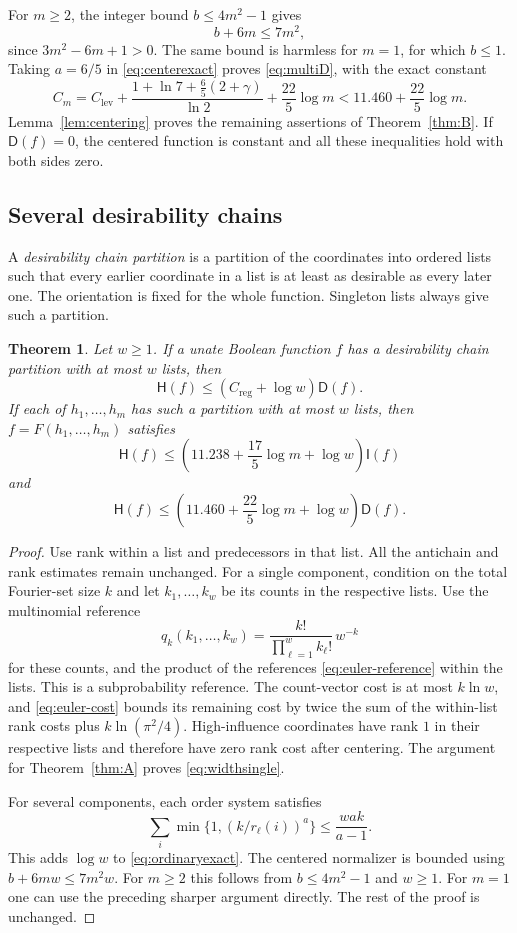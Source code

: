 \documentclass[11pt]{amsart}
\newtheorem{theorem}{Theorem}[section]
\theoremstyle{definition}
\theoremstyle{remark}
\newcommand{\HH}{\mathsf H}
\newcommand{\I}{\mathsf I}
\newcommand{\D}{\mathsf D}
\newcommand{\Clev}{C_{\mathrm{lev}}}
\newcommand{\Creg}{C_{\mathrm{reg}}}
\newcommand{\Cmulti}{C_m}
\begin{document}
For $m\ge2$, the integer bound $b\le4m^2-1$ gives
\[
 b+6m\le7m^2,
\]
since $3m^2-6m+1>0$.
The same bound is harmless for $m=1$, for which $b\le1$.
Taking $a=6/5$ in \eqref{eq:centerexact} proves \eqref{eq:multiD}, with the exact constant
\begin{equation}\label{eq:cm}
 \Cmulti=\Clev+\frac{1+\ln7+\frac65(2+\gamma)}{\ln2}
               +\frac{22}{5}\log m
       <11.460+\frac{22}{5}\log m.
\end{equation}
Lemma~\ref{lem:centering} proves the remaining assertions of Theorem~\ref{thm:B}.
If $\D(f)=0$, the centered function is constant and all these inequalities hold with both sides zero.

\subsection{Several desirability chains}

A \emph{desirability chain partition} is a partition of the coordinates into ordered lists such that every earlier coordinate in a list is at least as desirable as every later one.
The orientation is fixed for the whole function.
Singleton lists always give such a partition.

\begin{theorem}\label{thm:width}
Let $w\ge1$. If a unate Boolean function $f$ has a desirability chain partition with at most $w$ lists, then
\begin{equation}\label{eq:widthsingle}
 \HH(f)\le(\Creg+\log w)\D(f).
\end{equation}
If each of $h_1,\ldots,h_m$ has such a partition with at most $w$ lists, then $f=F(h_1,\ldots,h_m)$ satisfies
\[
 \HH(f)\le\left(11.238+\frac{17}{5}\log m+\log w\right)\I(f)
\]
and
\[
 \HH(f)\le\left(11.460+\frac{22}{5}\log m+\log w\right)\D(f).
\]
\end{theorem}
\begin{proof}
Use rank within a list and predecessors in that list.
All the antichain and rank estimates remain unchanged.
For a single component, condition on the total Fourier-set size $k$ and
let $k_1,\ldots,k_w$ be its counts in the respective lists.
Use the multinomial reference
\[
 q_k(k_1,\ldots,k_w)=\frac{k!}{\prod_{\ell=1}^wk_\ell!}\,w^{-k}
\]
for these counts, and the product of the references
\eqref{eq:euler-reference} within the lists.
This is a subprobability reference. The count-vector cost is at most
$k\ln w$, and \eqref{eq:euler-cost} bounds its remaining cost by
twice the sum of the within-list rank costs plus $k\ln(\pi^2/4)$.
High-influence coordinates have rank $1$ in their respective lists and
therefore have zero rank cost after centering.
The argument for Theorem~\ref{thm:A} proves \eqref{eq:widthsingle}.

For several components, each order system satisfies
\[
 \sum_i\min\{1,(k/r_\ell(i))^a\}\le\frac{wak}{a-1}.
\]
This adds $\log w$ to \eqref{eq:ordinaryexact}.
The centered normalizer is bounded using
$b+6mw\le7m^2w$.
For $m\ge2$ this follows from $b\le4m^2-1$ and $w\ge1$.
For $m=1$ one can use the preceding sharper argument directly.
The rest of the proof is unchanged.
\end{proof}
\end{document}
